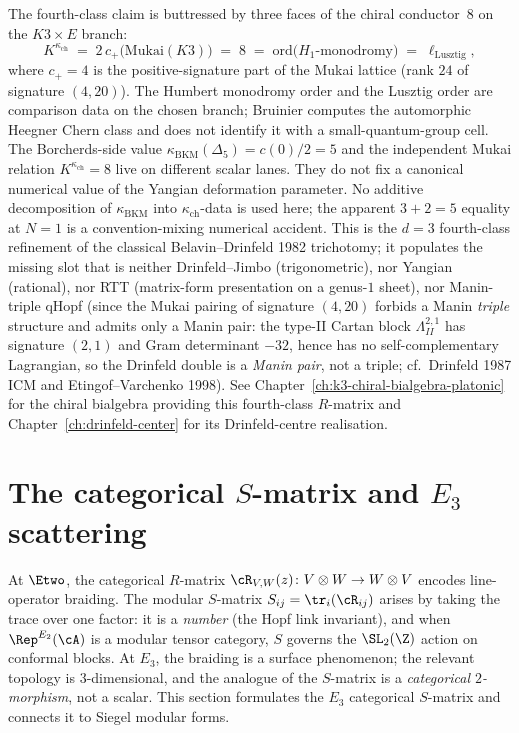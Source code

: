 \begin{remark}
The fourth-class claim is buttressed by three faces of the
chiral conductor~$8$ on the $K3 \times E$ branch:
\[
 K^{\kappa_{\mathrm{ch}}}
 \;=\; 2\,c_+\!\bigl(\mathrm{Mukai}(K3)\bigr)
 \;=\; 8
 \;=\; \mathrm{ord}\!\bigl(H_1\text{-monodromy}\bigr)
 \;=\; \ell_{\mathrm{Lusztig}},
\]
where \(c_+=4\) is the positive-signature part of the Mukai lattice
(rank \(24\) of signature \((4,20)\)). The Humbert monodromy order and
the Lusztig order are comparison data on the chosen branch; Bruinier
computes the automorphic Heegner Chern class and does not identify it
with a small-quantum-group cell. The Borcherds-side value
$\kappa_{\mathrm{BKM}}(\Delta_5)=c(0)/2=5$ and the independent Mukai
relation \(K^{\kappa_{\mathrm{ch}}}=8\) live on different scalar lanes.
They do not fix a canonical numerical value of the Yangian deformation
parameter.
No additive decomposition of $\kappa_{\mathrm{BKM}}$ into
$\kappa_{\mathrm{ch}}$-data is used here; the apparent $3+2=5$ equality
at $N=1$ is a convention-mixing numerical accident.
This is the $d = 3$ fourth-class refinement of the classical
Belavin--Drinfeld 1982 trichotomy; it populates the missing slot
that is neither Drinfeld--Jimbo (trigonometric), nor Yangian
(rational), nor RTT (matrix-form presentation on a genus-$1$
sheet), nor Manin-triple qHopf (since the Mukai pairing of
signature $(4, 20)$ forbids a Manin \emph{triple} structure and
admits only a Manin pair: the type-II Cartan block
$\Lambda^{2,1}_{II}$ has signature
$(2, 1)$ and Gram determinant $-32$, hence has no self-complementary Lagrangian, so the Drinfeld
double is a \emph{Manin pair}, not a triple; cf.\ Drinfeld 1987
ICM and Etingof--Varchenko 1998). See
Chapter~\ref{ch:k3-chiral-bialgebra-platonic} for the chiral
bialgebra providing this fourth-class $R$-matrix and
Chapter~\ref{ch:drinfeld-center} for its Drinfeld-centre
realisation.
\end{remark}


\section{The categorical \texorpdfstring{$S$}{S}-matrix and \texorpdfstring{$E_3$}{E-3} scattering}
\label{sec:categorical-s-matrix}

At $\Etwo$, the categorical $R$-matrix $\cR_{V,W}(z) \colon V \otimes W
\to W \otimes V$ encodes line-operator braiding. The modular $S$-matrix
$S_{ij} = \tr_i(\cR_{ij})$ arises by taking the trace over one factor:
it is a \emph{number} (the Hopf link invariant), and when
$\Rep^{E_2}(\cA)$ is a modular tensor category, $S$ governs the
$\SL_2(\Z)$ action on conformal blocks. At $E_3$, the braiding is a
surface phenomenon; the relevant topology is $3$-dimensional, and
the analogue of the $S$-matrix is a \emph{categorical $2$-morphism},
not a scalar. This section formulates the $E_3$ categorical $S$-matrix
and connects it to Siegel modular forms.

